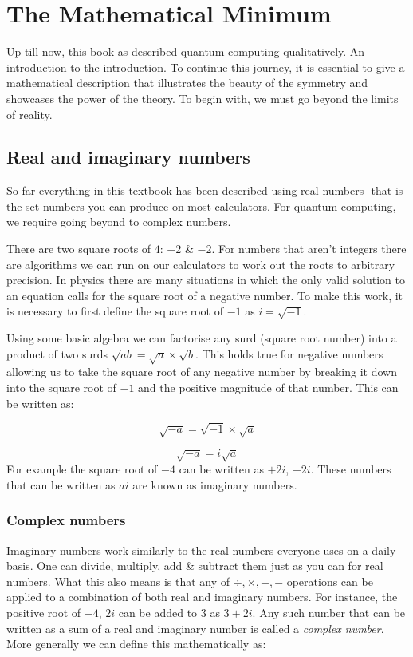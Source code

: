 
\chapter{The Mathematical Minimum}

Up till now, this book as described quantum computing qualitatively. An introduction to the introduction. To continue this journey, it is essential to give a mathematical description that illustrates the beauty of the symmetry and showcases the power of the theory. To begin with, we must go beyond the limits of reality. 

\section{Real and imaginary numbers}

So far everything in this textbook has been described using real numbers- that is the set numbers you can produce on most calculators. For quantum computing, we require going beyond to complex numbers. 

There are two square roots of $4$: $+2$ \& $-2$. For numbers that aren't integers there are algorithms we can run on our calculators to work out the roots to arbitrary precision. In physics there are many situations in which the only valid solution to an equation calls for the square root of a negative number. To make this work, it is necessary to first define the square root of $-1$ as $i = \sqrt{-1}$. 

Using some basic algebra we can factorise any surd (square root number) into a product of two surds $ \sqrt{ab} = \sqrt{a} \times \sqrt{b}$. This holds true for negative numbers allowing us to take the square root of any negative number by breaking it down into the square root of $-1$ and the positive magnitude of that number. This can be written as:

$$ \sqrt{-a} = \sqrt{-1} \times \sqrt{a} $$

$$ \sqrt{-a} = i \sqrt{a} $$
For example the square root of $-4$ can be written as $+2i$, $-2i$.
These numbers that can be written as $ai$ are known as imaginary numbers. 

\subsection{ Complex numbers}

Imaginary numbers work similarly to the real numbers everyone uses on a  daily basis. One can divide, multiply, add \& subtract them just as you can for real numbers. What this also means is that any of $ \div ,\times, +, - $ operations can be applied to a combination of both real and imaginary numbers. For instance, the positive root of $-4$, $2i$ can be added to $3$ as $3 + 2i $. Any such number that can be written as a sum of a real and imaginary number is called a \textit{complex number}. More generally we can define this mathematically as:

